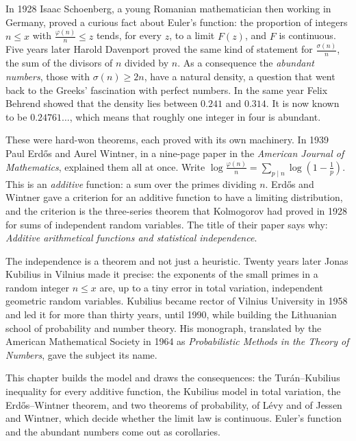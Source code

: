 In 1928 Isaac Schoenberg, a young Romanian mathematician then working in Germany, proved a curious fact about Euler's function: the proportion of integers $n\le x$ with $\frac{\varphi(n)}n\le z$ tends, for every $z$, to a limit $F(z)$, and $F$ is continuous. Five years later Harold Davenport proved the same kind of statement for $\frac{\sigma(n)}n$, the sum of the divisors of $n$ divided by $n$. As a consequence the \emph{abundant numbers}, those with $\sigma(n)\ge2n$, have a natural density, a question that went back to the Greeks' fascination with perfect numbers. In the same year Felix Behrend showed that the density lies between $0.241$ and $0.314$. It is now known to be $0.24761\ldots$, which means that roughly one integer in four is abundant.

These were hard-won theorems, each proved with its own machinery. In 1939 Paul Erd\H{o}s and Aurel Wintner, in a nine-page paper in the \emph{American Journal of Mathematics}, explained them all at once. Write $\log\frac{\varphi(n)}n=\sum_{p\mid n}\log(1-\frac1p)$. This is an \emph{additive} function: a sum over the primes dividing $n$. Erd\H{o}s and Wintner gave a criterion for an additive function to have a limiting distribution, and the criterion is the three-series theorem that Kolmogorov had proved in 1928 for sums of independent random variables. The title of their paper says why: \emph{Additive arithmetical functions and statistical independence}.

The independence is a theorem and not just a heuristic. Twenty years later Jonas Kubilius in Vilnius made it precise: the exponents of the small primes in a random integer $n\le x$ are, up to a tiny error in total variation, independent geometric random variables. Kubilius became rector of Vilnius University in 1958 and led it for more than thirty years, until 1990, while building the Lithuanian school of probability and number theory. His monograph, translated by the American Mathematical Society in 1964 as \emph{Probabilistic Methods in the Theory of Numbers}, gave the subject its name.

This chapter builds the model and draws the consequences: the Tur\'an--Kubilius inequality for every additive function, the Kubilius model in total variation, the Erd\H{o}s--Wintner theorem, and two theorems of probability, of L\'evy and of Jessen and Wintner, which decide whether the limit law is continuous. Euler's function and the abundant numbers come out as corollaries.

